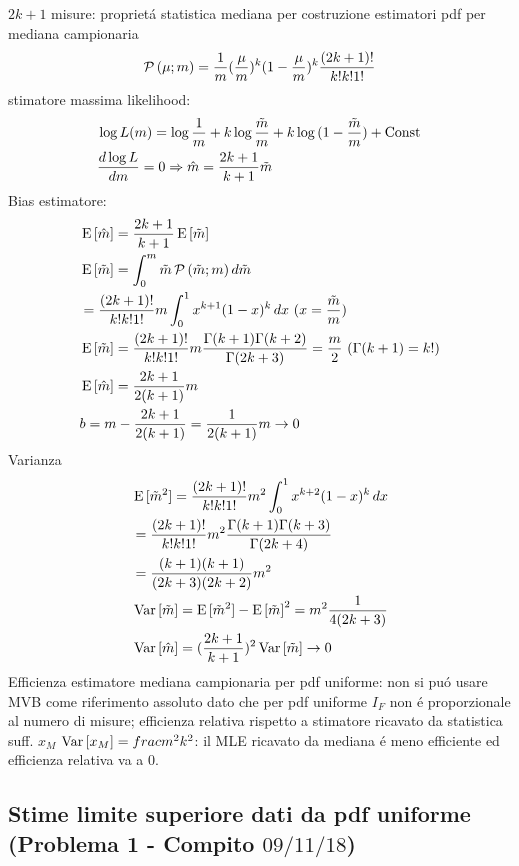 \documentclass[asd-beamer.tex]{subfiles}
\begin{document}
\begin{frame}{$2k+1$ misure: propriet\'a statistica mediana per costruzione estimatori}
pdf per mediana campionaria
\begin{equation*}	\prob{(\mu;m)}=\frac{1}{m}(\frac{\mu}{m})^k(1-\frac{\mu}{m})^k\frac{(2k+1)!}{k!k!1!}
\end{equation*}
stimatore massima likelihood:
\begin{align*}
&\log{L(m)}=\log{\frac{1}{m}}+k\log{\frac{\tilde{m}}{m}}+k\log{(1-\frac{\tilde{m}}{m})}+\const{}\\
&\TDy{m}{\log{L}}=0 \Rightarrow \hat{m}=\frac{2k+1}{k+1}\tilde{m}
\end{align*}
Bias estimatore:
\begin{align*}
&\E{[\hat{m}]}=\frac{2k+1}{k+1}\E{[\tilde{m}]}\\
&\E{[\tilde{m}]}=\int_0^m\tilde{m}\prob{(\tilde{m};m)}\,d\tilde{m}\\
&=\frac{(2k+1)!}{k!k!1!}m\int_0^1x^{k+1}(1-x)^k\,dx\ (x=\frac{\tilde{m}}{m})\\
&\E{[\tilde{m}]}=\frac{(2k+1)!}{k!k!1!}m\frac{\Gamma(k+1)\Gamma(k+2)}{\Gamma(2k+3)}=\frac{m}{2}\ (\Gamma(k+1)=k!)\\
&\E{[\hat{m}]}=\frac{2k+1}{2(k+1)}m\\
&b=m-\frac{2k+1}{2(k+1)}=\frac{1}{2(k+1)}m\to0
\end{align*}
Varianza
\begin{align*}
&\E{[\tilde{m}^2]}=\frac{(2k+1)!}{k!k!1!}m^2\int_0^1x^{k+2}(1-x)^k\,dx\\
&=\frac{(2k+1)!}{k!k!1!}m^2\frac{\Gamma(k+1)\Gamma(k+3)}{\Gamma(2k+4)}\\
&=\frac{(k+1)(k+1)}{(2k+3)(2k+2)}m^2\\
&\var{[\tilde{m}]}=\E{[\tilde{m}^2]}-\E{[\tilde{m}]}^2=m^2\frac{1}{4(2k+3)}\\
&\var{[\hat{m}]}=(\frac{2k+1}{k+1})^2\var{[\tilde{m}]}\to0
\end{align*}
Efficienza estimatore mediana campionaria per pdf uniforme: non si pu\'o usare MVB come riferimento assoluto dato che per pdf uniforme $I_F$ non \'e proporzionale al numero di misure; efficienza relativa rispetto a stimatore ricavato da statistica suff. $x_M$ $\var{[x_M]}=frac{m^2}{k^2}$: il MLE ricavato da mediana \'e meno efficiente ed efficienza relativa va a 0.
\end{frame}

\subsection{Stime limite superiore dati da pdf uniforme (Problema 1 - Compito $09/11/18$)}
\end{document}
